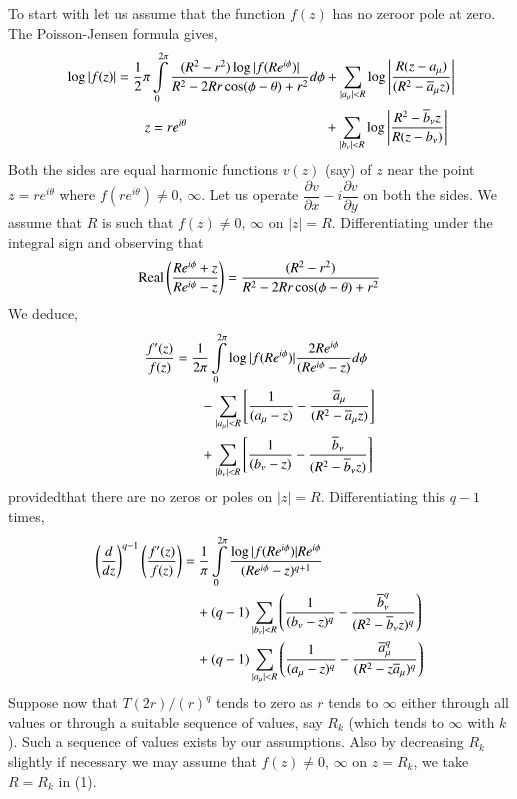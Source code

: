 To start with let us assume that the function $f(z)$ has no
zero\pageoriginale or pole at zero. The Poisson-Jensen formula gives,
\begin{align*}
& \log |f(z)|=\frac{1}{2}\pi
\int\limits^{2\pi}_{0}\frac{(R^{2}-r^{2})\log
  |f(Re^{i\phi})|}{R^{2}-2Rr\cos(\phi-\theta)+r^{2}}d\phi +
\sum\limits_{|a_{\mu}|<R}\log \left|
\frac{R(z-a_{\mu})}{(R^{2}-\ob{a}_{\mu}z)}\right|\\ 
&\hspace{2cm} z=re^{i\theta}\hspace{3.47cm} +\sum_{|b_{\nu}|<R}\log
\left|\frac{R^{2}-\ob{b}_{\nu}z}{R(z-b_{\nu})}\right| 
\end{align*}
Both the sides are equal harmonic functions $v(z)$ (say) of $z$ near
the point $z=re^{i\theta}$ where $f(re^{i\theta})\neq 0$,
$\infty$. Let us operate $\dfrac{\partial v}{\partial
  x}-i\dfrac{\partial v}{\partial y}$ on both the sides. We assume
that $R$ is such that $f(z)\neq 0$, $\infty$ on
$|z|=R$. Differentiating under the integral sign and observing that
$$
\operatorname{Real} 
\left(\frac{Re^{i\phi}+z}{Re^{i\phi}-z}\right) =
\frac{(R^{2}-r^{2})}{R^{2}-2Rr\cos(\phi-\theta)+r^{2}}  
$$
We deduce,
\begin{align*}
& \frac{f'(z)}{f(z)}=\frac{1}{2\pi}\int\limits^{2\pi}_{0}\log|f(Re^{i\phi})|\frac{2Re^{i\phi}}{(Re^{i\phi}-z)}d\phi\\
&\qquad\qquad
-\sum_{|a_{\mu}|<R}\left[\frac{1}{(a_{\mu}-z)}-\frac{\overline{a}_{\mu}}{(R^{2}-\overline{a}_{\mu}z)}\right]\\
&\qquad\qquad
+\sum_{|b_{\nu}|<R}\left[\frac{1}{(b_{\nu}-z)}-\frac{\overline{b}_{\nu}}{(R^{2}-\overline{b}_{\nu}z)}\right] 
\end{align*} 
provided\pageoriginale that there are no zeros or poles on
$|z|=R$. Differentiating this $q-1$ times,
\begin{align*}
\left(\frac{d}{dz}\right)^{q-1} \left(\frac{f'(z)}{f(z)}\right) &
=\frac{1}{\pi}\int\limits^{2\pi}_{0}\frac{\log
  |f(Re^{i\phi})|Re^{i\phi}}{(Re^{i\phi}-z)^{q+1}}\\ 
&\quad +(q-1)\sum_{|b_{\nu}|<R}\left(\frac{1}{(b_{\nu}-z)^{q}}-\frac{\overline{b}_{\nu}^{q}}{(R^{2}-\overline{b}_{\nu}z)^{q}}\right)\\
&\quad +(q-1)\sum_{|a_{\mu}|<R}\left(\frac{1}{(a_{\mu}-z)^{q}}-\frac{\overline{a}^{q}_{\mu}}{(R^{2}-z\overline{a}_{\mu})^{q}}\right)
\end{align*}
Suppose now that $T(2r)/(r)^{q}$ tends to zero as $r$ tends to
$\infty$ either through all values or through a suitable sequence of
values, say $R_{k}$ (which tends to $\infty$ with $k$). Such a
sequence of values exists by our assumptions. Also by decreasing
$R_{k}$ slightly if necessary we may assume that $f(z)\neq 0$,
$\infty$ on $z=R_{k}$, we take $R=R_{k}$ in (1).  


